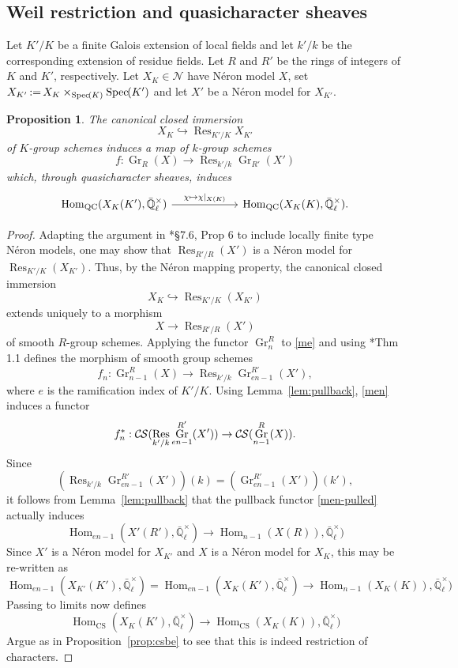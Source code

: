 \documentclass[10pt]{amsart}
\theoremstyle{plain}
\newtheorem{proposition}[theorem]{Proposition}
\theoremstyle{definition}
\theoremstyle{remark}
\newcommand{\EE}{\mathbb{\bar Q}_\ell}
\newcommand{\Fq}{k}
\newcommand{\EEx}{\EE^\times}
\DeclareMathOperator{\Hom}{Hom}
\DeclareMathOperator{\Gr}{Gr}
\DeclareMathOperator{\Res}{Res}
\newcommand{\Spec}[1]{{\operatorname{Spec}\hskip-1pt( #1 )}}
\newcommand{\ceq}{{\, :=\, }}
\newcommand{\CS}{{\mathcal{C\hskip-0.8pt S}}}
\begin{document}
\subsection{Weil restriction and quasicharacter sheaves}\label{ssec:wrK}

Let $K'/K$ be a finite Galois extension of local fields and
let $k'/k$ be the corresponding extension of residue fields.
Let $R$ and $R'$ be the rings of integers of $K$ and $K'$, respectively.
Let $X_K \in \mathcal{N}$ have N\'eron model $X$, set $X_{K'} \ceq X_K \times_\Spec{K} \Spec{K'}$
and let $X'$ be a N\'eron model for $X_{K'}$.

\begin{proposition}\label{prop:wrK}
The canonical closed immersion 
\[
X_K \hookrightarrow \Res_{K'/K} X_{K'}
\]
of $K$-group schemes
induces a map of $\Fq$-group schemes 
\[
f : \Gr_R(X) \to \Res_{k'/k} \Gr_{R'}(X')
\] 
which, through quasicharacter sheaves, induces
\[
\begin{tikzcd}[column sep=60]
\Hom_{\text{QC}}(X_K(K'), \EEx) \arrow{r}{\chi \mapsto \chi\vert_{X(K)}} &\Hom_{\text{QC}}(X_K(K), \EEx).
\end{tikzcd}
\]
\end{proposition}

\begin{proof}
Adapting the argument in \cite{bosch-lutkebohmert-reynaud:NeronModels}*{\S 7.6, Prop 6} to include locally finite type N\'eron models,
one may show that $\Res_{R'/R}(X')$ is a N\'eron model for $\Res_{K'/K}(X_{K'})$.
Thus, by the N\'eron mapping property, the canonical closed immersion
\[
X_K\hookrightarrow \Res_{K'/K}(X_{K'})
\]
 extends uniquely to a morphism
\begin{equation}\label{me}
X\to \Res_{R'/R}(X')
\end{equation}
 of smooth $R$-group schemes.
%
Applying the functor $\Gr^R_{n}$ to \eqref{me}
and using \cite{bertrapelle-gonzales:Greenberg}*{Thm 1.1} defines the morphism of smooth group schemes
\begin{equation}\label{men}
f_n: \Gr_{n-1}^R(X) \to \Res_{k'/k} \Gr_{en-1}^{R'}(X'),
\end{equation}
where $e$ is the ramification index of $K'/K$.
Using Lemma~\ref{lem:pullback}, \eqref{men} induces a functor 
\begin{equation}\label{men-pulled}
f_n^* : \CS(\Res_{k'/k} \Gr_{en-1}^{R'}(X'))\to \CS(\Gr_{n-1}^{R}(X)).
\end{equation}
Since 
\[
\left(\Res_{k'/k} \Gr_{en-1}^{R'}(X') \right)(\Fq) = \left(\Gr_{en-1}^{R'}(X')\right)(k'),
\]
it follows from Lemma~\ref{lem:pullback} that the pullback functor \eqref{men-pulled} actually induces
\[ 
\Hom_{en-1}(X'(R'),\EEx) \to \Hom_{n-1}(X(R)),\EEx)
\]
Since $X'$ is a N\'eron model for $X_{K'}$ and $X$ is a N\'eron model for $X_K$,
 this may be re-written as
 \[ 
\Hom_{en-1}(X_{K'}(K'),\EEx)= \Hom_{en-1}(X_{K}(K'),\EEx) \to \Hom_{n-1}(X_K(K)),\EEx)
\]
Passing to limits now defines
\[ 
\Hom_\text{CS}(X_K(K'),\EEx) \to \Hom_\text{CS}(X_K(K)),\EEx)
\]
Argue as in Proposition~\ref{prop:csbe} to see that this is indeed restriction of characters.
\end{proof}
\end{document}
